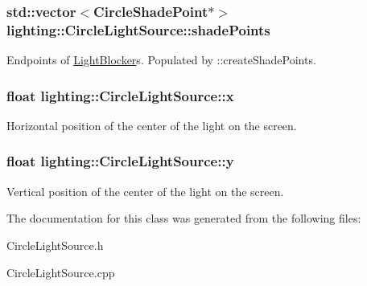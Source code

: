 \subsubsection[{\texorpdfstring{shade\+Points}{shadePoints}}]{\setlength{\rightskip}{0pt plus 5cm}std\+::vector$<${\bf Circle\+Shade\+Point}$\ast$$>$ lighting\+::\+Circle\+Light\+Source\+::shade\+Points\hspace{0.3cm}{\ttfamily [protected]}}\hypertarget{classlighting_1_1CircleLightSource_acdfea64be9d142f669338c5e206e753e}{}\label{classlighting_1_1CircleLightSource_acdfea64be9d142f669338c5e206e753e}


Endpoints of \hyperlink{classlighting_1_1LightBlocker}{Light\+Blocker}s. Populated by \+::create\+Shade\+Points. 

\subsubsection[{\texorpdfstring{x}{x}}]{\setlength{\rightskip}{0pt plus 5cm}float lighting\+::\+Circle\+Light\+Source\+::x\hspace{0.3cm}{\ttfamily [protected]}}\hypertarget{classlighting_1_1CircleLightSource_afd27de5d967e2a308dadeff29d3c2883}{}\label{classlighting_1_1CircleLightSource_afd27de5d967e2a308dadeff29d3c2883}


Horizontal position of the center of the light on the screen. 

\subsubsection[{\texorpdfstring{y}{y}}]{\setlength{\rightskip}{0pt plus 5cm}float lighting\+::\+Circle\+Light\+Source\+::y\hspace{0.3cm}{\ttfamily [protected]}}\hypertarget{classlighting_1_1CircleLightSource_ac05186b92c9bdfcef8a27cc89f8c9b52}{}\label{classlighting_1_1CircleLightSource_ac05186b92c9bdfcef8a27cc89f8c9b52}


Vertical position of the center of the light on the screen. 



The documentation for this class was generated from the following files\+:\begin{DoxyCompactItemize}
\item 
Circle\+Light\+Source.\+h\item 
Circle\+Light\+Source.\+cpp\end{DoxyCompactItemize}
